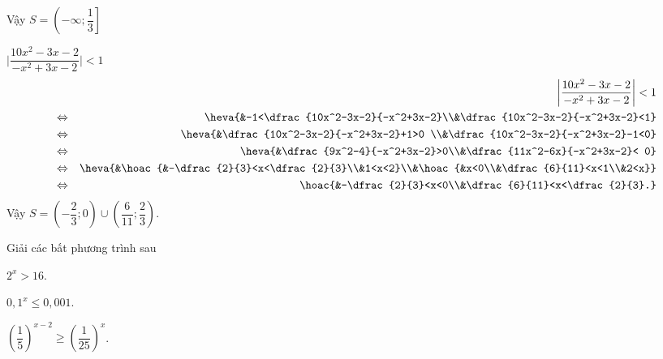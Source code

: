 \begin{bt}
{\begin{listEX}[3]
			Vậy $S=\left(-\infty;\dfrac{1}{3}\right]$
			\item $\bigg|\dfrac{10x^2-3x-2}{-x^2+3x-2}\bigg|<1$	
			\allowdisplaybreaks
			\begin{eqnarray*}
				&&\bigg|\dfrac{10x^2-3x-2}{-x^2+3x-2}\bigg|<1\\
				&\Leftrightarrow & \heva{&-1<\dfrac{10x^2-3x-2}{-x^2+3x-2}\\&\dfrac{10x^2-3x-2}{-x^2+3x-2}<1}\\
				&\Leftrightarrow & \heva{&\dfrac{10x^2-3x-2}{-x^2+3x-2}+1>0 \\&\dfrac{10x^2-3x-2}{-x^2+3x-2}-1<0}\\
				&\Leftrightarrow & \heva{&\dfrac{9x^2-4}{-x^2+3x-2}>0\\&\dfrac{11x^2-6x}{-x^2+3x-2}< 0}\\
				&\Leftrightarrow &\heva{&\hoac{&-\dfrac{2}{3}<x<\dfrac{2}{3}\\&1<x<2}\\&\hoac{&x<0\\&\dfrac{6}{11}<x<1\\&2<x}}\\
				&\Leftrightarrow & \hoac{&-\dfrac{2}{3}<x<0\\&\dfrac{6}{11}<x<\dfrac{2}{3}.}
			\end{eqnarray*}
			Vậy $S=\left(-\dfrac{2}{3};0\right)\cup \left(\dfrac{6}{11};\dfrac{2}{3}\right)$.
		\end{listEX}
	}
\end{bt}

\begin{bt}%
	Giải các bất phương trình sau
	\begin{listEX}[3]
		\item $2^x>16$.
		\item $0{,}1^x \leq 0{,}001$.
		\item $\left(\dfrac{1}{5}\right)^{x-2} \geq\left(\dfrac{1}{25}\right)^x$.
	\end{listEX}
\end{bt}
